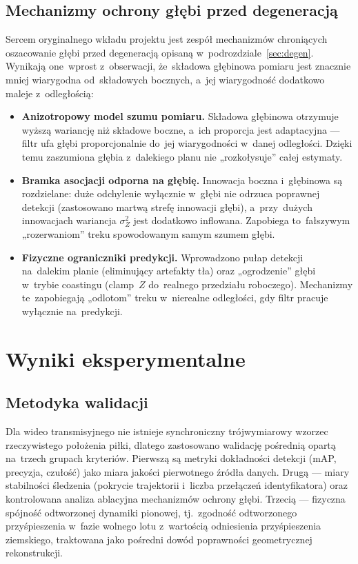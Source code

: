 \documentclass[14pt,a4paper]{extarticle}
\begin{document}
\subsection{Mechanizmy ochrony głębi przed degeneracją}
\label{sec:ochrona}
Sercem oryginalnego wkładu projektu jest zespół mechanizmów chroniących oszacowanie głębi
przed degeneracją opisaną w~podrozdziale~\ref{sec:degen}. Wynikają one~wprost z~obserwacji,
że~składowa głębinowa pomiaru jest znacznie mniej wiarygodna od~składowych bocznych,
a~jej wiarygodność dodatkowo maleje z~odległością:
\begin{itemize}[leftmargin=1.4em, itemsep=3pt]
  \item \textbf{Anizotropowy model szumu pomiaru.} Składowa głębinowa otrzymuje wyższą
        wariancję niż składowe boczne, a~ich proporcja jest adaptacyjna — filtr ufa głębi
        proporcjonalnie do~jej wiarygodności w~danej odległości. Dzięki temu zaszumiona
        głębia z~dalekiego planu nie „rozkołysuje” całej estymaty.
  \item \textbf{Bramka asocjacji odporna na głębię.} Innowacja boczna i~głębinowa są
        rozdzielane: duże odchylenie wyłącznie w~głębi nie odrzuca poprawnej detekcji
        (zastosowano martwą strefę innowacji głębi), a~przy~dużych innowacjach wariancja
        $\sigma_Z^2$ jest dodatkowo inflowana. Zapobiega to~fałszywym „rozerwaniom” treku
        spowodowanym samym szumem głębi.
  \item \textbf{Fizyczne ograniczniki predykcji.} Wprowadzono pułap detekcji na~dalekim
        planie (eliminujący artefakty tła) oraz „ogrodzenie” głębi w~trybie coastingu
        (clamp~$Z$ do~realnego przedziału roboczego). Mechanizmy te~zapobiegają „odlotom”
        treku w~nierealne odległości, gdy filtr pracuje wyłącznie na~predykcji.
\end{itemize}

\section{Wyniki eksperymentalne}

\subsection{Metodyka walidacji}
Dla wideo transmisyjnego nie istnieje synchroniczny trójwymiarowy wzorzec rzeczywistego
położenia piłki, dlatego zastosowano walidację pośrednią opartą na~trzech grupach
kryteriów. Pierwszą są metryki dokładności detekcji (mAP, precyzja, czułość) jako miara
jakości pierwotnego źródła danych. Drugą — miary stabilności śledzenia (pokrycie
trajektorii i~liczba przełączeń identyfikatora) oraz kontrolowana analiza ablacyjna
mechanizmów ochrony głębi. Trzecią — fizyczna spójność odtworzonej dynamiki pionowej,
tj.~zgodność odtworzonego przyśpieszenia w~fazie wolnego lotu z~wartością odniesienia
przyśpieszenia ziemskiego, traktowana jako pośredni dowód poprawności geometrycznej
rekonstrukcji.
\end{document}
